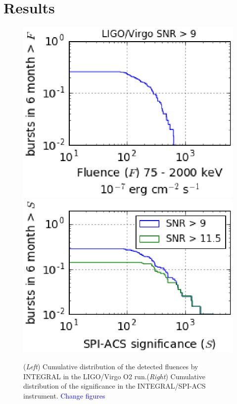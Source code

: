 \documentclass[11pt]{article}
\begin{document}
\section*{Results}


\begin{figure}
	\centering
    \includegraphics[scale=.6]{P7-1_f1.eps}
    \includegraphics[scale=.6]{P7-1_f2.eps}
    \caption{(\textit{Left}) Cumulative distribution of the
      detected fluences by INTEGRAL in the LIGO/Virgo O2
      run.(\textit{Right}) Cumulative distribution of the significance
      in the INTEGRAL/SPI-ACS instrument. \textcolor{blue}{Change figures}}
    \label{fluence_significance}
\end{figure}
\end{document}
